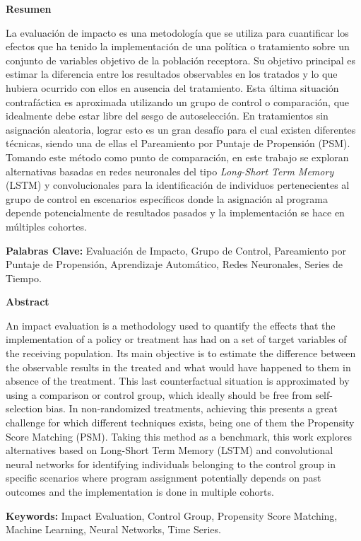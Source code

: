 \documentclass[../main.tex]{subfiles}
\begin{document}
\noindent \textbf{Resumen}

La evaluación de impacto es una metodología que se utiliza para cuantificar los efectos
que ha tenido la implementación de una política o tratamiento sobre un conjunto de
variables objetivo de la población receptora. Su objetivo principal es estimar la
diferencia entre los resultados observables en los tratados y lo que hubiera ocurrido con
ellos en ausencia del tratamiento. Esta última situación contrafáctica es aproximada
utilizando un grupo de control o comparación, que idealmente debe estar libre del sesgo de
autoselección. En tratamientos sin asignación aleatoria, lograr esto es un gran desafío
para el cual existen diferentes técnicas, siendo una de ellas el Pareamiento por Puntaje
de Propensión (PSM). Tomando este método como punto de comparación, en este trabajo se
exploran alternativas basadas en redes neuronales del tipo \textit{Long-Short Term Memory}
(LSTM) y convolucionales para la identificación de individuos pertenecientes al grupo de
control en escenarios específicos donde la asignación al programa depende potencialmente
de resultados pasados y la implementación se hace en múltiples cohortes.

\medskip

\noindent \textbf{Palabras Clave: } Evaluación de Impacto, Grupo de Control, Pareamiento
por Puntaje de Propensión, Aprendizaje Automático, Redes Neuronales, Series de Tiempo.

\bigskip
\bigskip

\noindent \textbf{Abstract}

An impact evaluation is a methodology used to quantify the effects that the implementation
of a policy or treatment has had on a set of target variables of the receiving population.
Its main objective is to estimate the difference between the observable results in the
treated and what would have happened to them in absence of the treatment. This last
counterfactual situation is approximated by using a comparison or control group, which
ideally should be free from self-selection bias. In non-randomized treatments, achieving
this presents a great challenge for which different techniques exists, being one of them
the Propensity Score Matching (PSM). Taking this method as a benchmark, this work explores
alternatives based on Long-Short Term Memory (LSTM) and convolutional neural networks for
identifying individuals belonging to the control group in specific scenarios where program
assignment potentially depends on past outcomes and the implementation is done in
multiple cohorts.

\medskip

\noindent \textbf{Keywords: } Impact Evaluation, Control Group, Propensity Score Matching,
Machine Learning, Neural Networks, Time Series.
\end{document}
